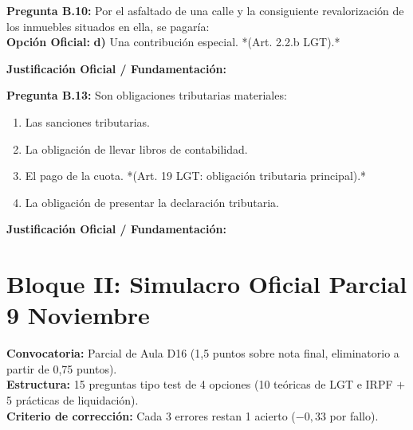 \documentclass[11pt,a4paper,openany]{article}
\begin{document}
\noindent\textbf{\sffamily Pregunta B.10:} Por el asfaltado de una calle y la consiguiente revalorización de los inmuebles situados en ella, se pagaría:\\[0.15cm]
\noindent\textbf{Opción Oficial:} \textbf{d)} Una contribución especial. *(Art. 2.2.b LGT).*\\[0.15cm]
\begin{solucionBox}
\textbf{Justificación Oficial / Fundamentación:}\\[0.1cm]

\end{solucionBox}
\vspace{0.35cm}

\noindent\textbf{\sffamily Pregunta B.13:} Son obligaciones tributarias materiales:\\[0.15cm]
\begin{enumerate}[label=\textbf{\alph*)},leftmargin=1.8em,itemsep=1.5pt,topsep=2pt,partopsep=0pt,parsep=0pt]
    \item Las sanciones tributarias.
    \item La obligación de llevar libros de contabilidad.
    \item El pago de la cuota. *(Art. 19 LGT: obligación tributaria principal).*
    \item La obligación de presentar la declaración tributaria.
\end{enumerate}
\begin{solucionBox}
\textbf{Justificación Oficial / Fundamentación:}\\[0.1cm]

\end{solucionBox}
\vspace{0.35cm}

\newpage
\section{Bloque II: Simulacro Oficial Parcial 9 Noviembre}
\label{sec:simulacro}

\begin{enunciadoBox}
\textbf{Convocatoria:} Parcial de Aula D16 (1,5 puntos sobre nota final, eliminatorio a partir de 0,75 puntos).\\
\textbf{Estructura:} 15 preguntas tipo test de 4 opciones (10 teóricas de LGT e IRPF $+$ 5 prácticas de liquidación).\\
\textbf{Criterio de corrección:} Cada 3 errores restan 1 acierto ($-0,33$ por fallo).
\end{enunciadoBox}
\end{document}
